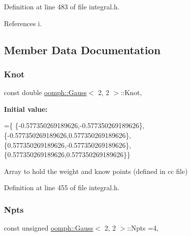Definition at line 483 of file integral.\+h.



References i.



\subsection{Member Data Documentation}
\mbox{\label{classoomph_1_1Gauss_3_012_00_012_01_4_afcfd9bf8c2bf7e9bbc42e90d5868e530}} 
\subsubsection{\texorpdfstring{Knot}{Knot}}
{\footnotesize\ttfamily const double \hyperlink{classoomph_1_1Gauss}{oomph\+::\+Gauss}$<$ 2, 2 $>$\+::Knot\hspace{0.3cm}{\ttfamily [static]}, {\ttfamily [private]}}

{\bfseries Initial value\+:}
\begin{DoxyCode}
=\{
 \{-0.577350269189626,-0.577350269189626\},
 \{-0.577350269189626,0.577350269189626\},
 \{0.577350269189626,-0.577350269189626\},
 \{0.577350269189626,0.577350269189626\}\}
\end{DoxyCode}


Array to hold the weight and know points (defined in cc file) 



Definition at line 455 of file integral.\+h.

\mbox{\label{classoomph_1_1Gauss_3_012_00_012_01_4_a29a76ea48e4ca0de157896e062d981e3}} 
\subsubsection{\texorpdfstring{Npts}{Npts}}
{\footnotesize\ttfamily const unsigned \hyperlink{classoomph_1_1Gauss}{oomph\+::\+Gauss}$<$ 2, 2 $>$\+::Npts =4\hspace{0.3cm}{\ttfamily [static]}, {\ttfamily [private]}}



